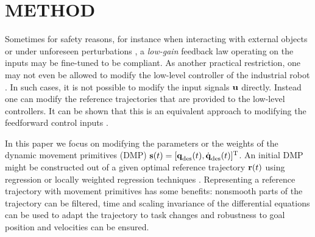 \section{METHOD}\label{method}

Sometimes for safety reasons, for instance when interacting with external objects or under unforeseen perturbations \cite{Schaal07}, a \emph{low-gain} feedback law operating on the inputs may be fine-tuned to be compliant. As another practical restriction, one may not even be allowed to modify the low-level controller of the industrial robot \cite{Longman2000}. In such cases, it is not possible to modify the input signals $\boldsymbol{\mathrm{u}}$ directly. Instead one can modify the reference trajectories that are provided to the low-level controllers. It can be shown that this is an equivalent approach to modifying the feedforward control inputs \cite{Bristow06}.

In this paper we focus on modifying the parameters or the weights of the dynamic movement primitives (DMP) $\boldsymbol{\mathrm{s}}(t) = [\boldsymbol{\mathrm{q}}_{\text{des}}(t),\dot{\boldsymbol{\mathrm{q}}}_{\text{des}}(t)]^{\mathrm{T}}$. An initial DMP might be constructed out of a given optimal reference trajectory $\boldsymbol{\mathrm{r}}(t)$ using regression or locally weighted regression techniques \cite{Ijspeert13}. Representing a reference trajectory with movement primitives has some benefits: nonsmooth parts of the trajectory can be filtered, time and scaling invariance of the differential equations can be used to adapt the trajectory to task changes and robustness to goal position and velocities can be ensured.

